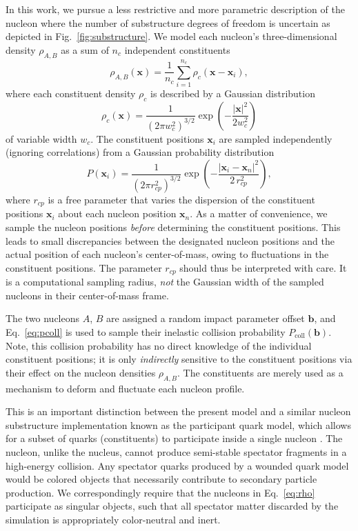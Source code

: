 \documentclass[aps,prc,reprint,amsmath,nofootinbib]{revtex4-1}
\newcommand{\rc}{r_{cp}}
\newcommand{\nc}{n_c}
\newcommand{\wc}{w_c}
\newcommand{\bv}{\mathbf b}
\newcommand{\xv}{\mathbf x}
\begin{document}
In this work, we pursue a less restrictive and more parametric description of the nucleon where the number of substructure degrees of freedom is uncertain as depicted in Fig.~\ref{fig:substructure}.
We model each nucleon's three-dimensional density $\rho_{A,B}$ as a sum of $\nc$ independent constituents
\begin{equation}
  \label{eq:rho}
  \rho_{A, B}(\xv) = \frac{1}{\nc} \sum\limits_{i=1}^{\nc} \rho_c(\xv - \xv_i),
\end{equation}
where each constituent density $\rho_c$ is described by a Gaussian distribution
\begin{equation}
  \rho_c(\xv) = \frac{1}{(2 \pi \wc^2)^{3/2}} \exp\left(- \frac{|\xv|^2}{2 \wc^2}\right)
\end{equation}
of variable width $\wc$.
The constituent positions $\xv_i$ are sampled independently (ignoring correlations) from a Gaussian probability distribution
\begin{equation}
  \label{eq:radial_dist}
  P(\xv_i) = \frac{1}{(2\pi \rc^2)^{3/2}} \exp\left(-\frac{|\xv_i - \xv_n|^2}{2\, \rc^2}\right),
\end{equation}
where $\rc$ is a free parameter that varies the dispersion of the constituent positions $\xv_i$ about each nucleon position $\xv_n$.
As a matter of convenience, we sample the nucleon positions \emph{before} determining the constituent positions.
This leads to small discrepancies between the designated nucleon positions and the actual position of each nucleon's center-of-mass, owing to fluctuations in the constituent positions.
The parameter $\rc$ should thus be interpreted with care.
It is a computational sampling radius, \emph{not} the Gaussian width of the sampled nucleons in their center-of-mass frame.

The two nucleons $A$, $B$ are assigned a random impact parameter offset $\bv$, and Eq.~\eqref{eq:pcoll} is used to sample their inelastic collision probability $P_\mathrm{coll}(\bv)$.
Note, this collision probability has no direct knowledge of the individual constituent positions; it is only \emph{indirectly} sensitive to the constituent positions via their effect on the nucleon densities $\rho_{A, B}$.
The constituents are merely used as a mechanism to deform and fluctuate each nucleon profile.

This is an important distinction between the present model and a similar nucleon substructure implementation known as the participant quark model, which allows for a subset of quarks (constituents) to participate inside a single nucleon \cite{ANISOVICH1978477, Broniowski:2016pvx}.
The nucleon, unlike the nucleus, cannot produce semi-stable spectator fragments in a high-energy collision.
Any spectator quarks produced by a wounded quark model would be colored objects that necessarily contribute to secondary particle production.
We correspondingly require that the nucleons in Eq.~\eqref{eq:rho} participate as singular objects, such that all spectator matter discarded by the simulation is appropriately color-neutral and inert.
\end{document}
